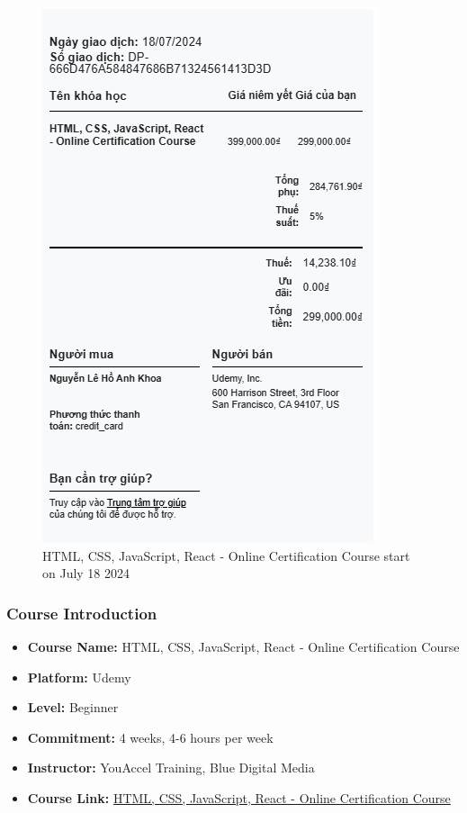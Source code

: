 \begin{figure}[H]
	\centering
	\includegraphics[width=0.7\linewidth]{img/Capture05.PNG}
	\caption{HTML, CSS, JavaScript, React - Online Certification Course start on July 18 2024}
	\label{fig:algorithmtoolbox}
\end{figure}
\subsubsection{Course Introduction}
\begin{itemize}
	\item \textbf{Course Name:} HTML, CSS, JavaScript, React - Online Certification Course
	\item \textbf{Platform:} Udemy
	\item \textbf{Level: } Beginner
	\item \textbf{Commitment:} 4 weeks, 4-6 hours per week
	\item \textbf{Instructor:} YouAccel Training, Blue Digital Media
	\item \textbf{Course Link:} \href{https://www.udemy.com/course/html-css-javascript-react-online-certification-course}{HTML, CSS, JavaScript, React - Online Certification Course}
\end{itemize}
